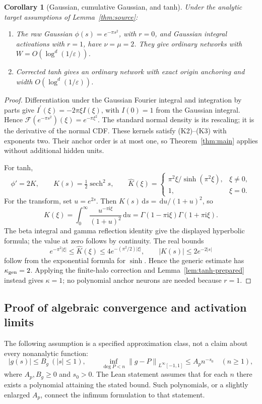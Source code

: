 \documentclass[11pt,letterpaper]{article}
\newcommand{\dd}{\,\mathrm d}
\newcommand{\ii}{\mathrm i}
\newcommand{\eps}{\varepsilon}
\newcommand{\norm}[1]{\left\lVert#1\right\rVert}
\newtheorem{corollary}[lemma]{Corollary}
\theoremstyle{definition}
\theoremstyle{remark}
\begin{document}
\begin{corollary}[Gaussian, cumulative Gaussian, and tanh]\label{cor:activations}
Under the analytic target assumptions of Lemma~\ref{thm:source}:
\begin{enumerate}
\item The raw Gaussian \(\phi(s)=e^{-\pi s^2}\), with \(r=0\), and Gaussian
      integral activations with \(r=1\), have \(\nu=\mu=2\). They give ordinary
      networks with \(W=O(\log^d(1/\eps))\).
\item Corrected tanh gives an ordinary network with exact origin anchoring
      and width \(O(\log^d(1/\eps))\).
\end{enumerate}
\end{corollary}
\begin{proof}
Differentiation under the Gaussian Fourier integral and integration by parts
give \(I^{\prime}(\xi)=-2\pi\xi I(\xi)\), with \(I(0)=1\) from the Gaussian integral. Hence
\(\mathcal F(e^{-\pi s^2})(\xi)=e^{-\pi\xi^2}\).
The standard normal density is its rescaling; it is the derivative of
the normal CDF. These kernels satisfy (K2)--(K3) with exponents two.
Their anchor order is at most one, so Theorem~\ref{thm:main} applies
without additional hidden units.

For tanh,
\[
 \phi'=2K,\qquad K(s)=\tfrac12\operatorname{sech}^2s,\qquad
 \widehat K(\xi)=
 \begin{cases}\pi^2\xi/\sinh(\pi^2\xi),&\xi\ne0,\\1,&\xi=0.\end{cases}
\]
For the transform, set \(u=e^{2s}\). Then \(K(s)\dd s=\dd u/(1+u)^2\), so
\[
 \widehat K(\xi)=\int_0^\infty\frac{u^{-\pi\ii\xi}}{(1+u)^2}\dd u
   =\Gamma(1-\pi\ii\xi)\Gamma(1+\pi\ii\xi).
\]
The beta integral and gamma reflection identity give the displayed hyperbolic
formula; the value at zero follows by continuity. The real bounds
\[
 e^{-\pi^2|\xi|}\le\widehat K(\xi)
       \le4e^{-(\pi^2/2)|\xi|},\qquad
 |K(s)|\le2e^{-2|s|}
\]
follow from the exponential formula for \(\sinh\).
Hence the generic estimate has \(\kappa_{\rm gen}=2\). Applying the
finite-halo correction and Lemma~\ref{lem:tanh-prepared} instead gives
\(\kappa=1\); no polynomial anchor neurons are needed because \(r=1\).
\end{proof}

\subsection{Proof of algebraic convergence and activation limits}
The following assumption is a specified approximation class, not a claim
about every nonanalytic function:
\begin{equation}\label{eq:poly-class}
 |g(s)|\le B_g\ (|s|\le1),\qquad
 \inf_{\deg P<n}\norm{g-P}_{L^\infty[-1,1]}\le A_p n^{-s_0}
 \quad(n\ge1),
\end{equation}
where \(A_p,B_g\ge0\) and \(s_0>0\). The Lean statement assumes that for each
\(n\) there exists a polynomial attaining the stated bound. Such polynomials,
or a slightly enlarged \(A_p\), connect the infimum formulation to that statement.
\end{document}
